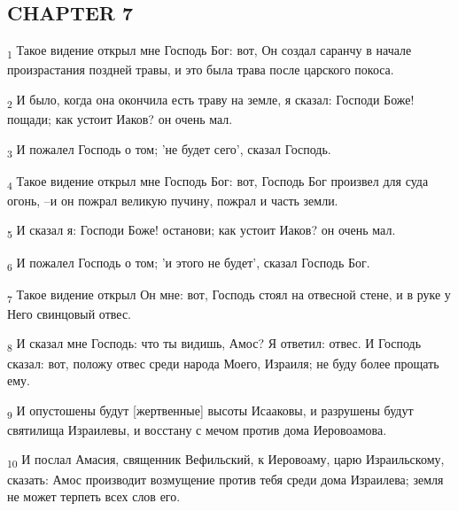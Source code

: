 \subsection{CHAPTER 7}
\begin{tcolorbox}
\textsubscript{1} Такое видение открыл мне Господь Бог: вот, Он создал саранчу в начале произрастания поздней травы, и это была трава после царского покоса.
\end{tcolorbox}
\begin{tcolorbox}
\textsubscript{2} И было, когда она окончила есть траву на земле, я сказал: Господи Боже! пощади; как устоит Иаков? он очень мал.
\end{tcolorbox}
\begin{tcolorbox}
\textsubscript{3} И пожалел Господь о том; 'не будет сего', сказал Господь.
\end{tcolorbox}
\begin{tcolorbox}
\textsubscript{4} Такое видение открыл мне Господь Бог: вот, Господь Бог произвел для суда огонь, --и он пожрал великую пучину, пожрал и часть земли.
\end{tcolorbox}
\begin{tcolorbox}
\textsubscript{5} И сказал я: Господи Боже! останови; как устоит Иаков? он очень мал.
\end{tcolorbox}
\begin{tcolorbox}
\textsubscript{6} И пожалел Господь о том; 'и этого не будет', сказал Господь Бог.
\end{tcolorbox}
\begin{tcolorbox}
\textsubscript{7} Такое видение открыл Он мне: вот, Господь стоял на отвесной стене, и в руке у Него свинцовый отвес.
\end{tcolorbox}
\begin{tcolorbox}
\textsubscript{8} И сказал мне Господь: что ты видишь, Амос? Я ответил: отвес. И Господь сказал: вот, положу отвес среди народа Моего, Израиля; не буду более прощать ему.
\end{tcolorbox}
\begin{tcolorbox}
\textsubscript{9} И опустошены будут [жертвенные] высоты Исааковы, и разрушены будут святилища Израилевы, и восстану с мечом против дома Иеровоамова.
\end{tcolorbox}
\begin{tcolorbox}
\textsubscript{10} И послал Амасия, священник Вефильский, к Иеровоаму, царю Израильскому, сказать: Амос производит возмущение против тебя среди дома Израилева; земля не может терпеть всех слов его.
\end{tcolorbox}
